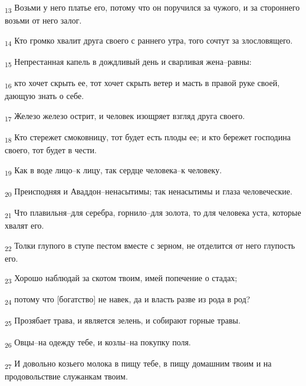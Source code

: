 \begin{tcolorbox}
\textsubscript{13} Возьми у него платье его, потому что он поручился за чужого, и за стороннего возьми от него залог.
\end{tcolorbox}
\begin{tcolorbox}
\textsubscript{14} Кто громко хвалит друга своего с раннего утра, того сочтут за злословящего.
\end{tcolorbox}
\begin{tcolorbox}
\textsubscript{15} Непрестанная капель в дождливый день и сварливая жена--равны:
\end{tcolorbox}
\begin{tcolorbox}
\textsubscript{16} кто хочет скрыть ее, тот хочет скрыть ветер и масть в правой руке своей, дающую знать о себе.
\end{tcolorbox}
\begin{tcolorbox}
\textsubscript{17} Железо железо острит, и человек изощряет взгляд друга своего.
\end{tcolorbox}
\begin{tcolorbox}
\textsubscript{18} Кто стережет смоковницу, тот будет есть плоды ее; и кто бережет господина своего, тот будет в чести.
\end{tcolorbox}
\begin{tcolorbox}
\textsubscript{19} Как в воде лицо--к лицу, так сердце человека--к человеку.
\end{tcolorbox}
\begin{tcolorbox}
\textsubscript{20} Преисподняя и Аваддон--ненасытимы; так ненасытимы и глаза человеческие.
\end{tcolorbox}
\begin{tcolorbox}
\textsubscript{21} Что плавильня--для серебра, горнило--для золота, то для человека уста, которые хвалят его.
\end{tcolorbox}
\begin{tcolorbox}
\textsubscript{22} Толки глупого в ступе пестом вместе с зерном, не отделится от него глупость его.
\end{tcolorbox}
\begin{tcolorbox}
\textsubscript{23} Хорошо наблюдай за скотом твоим, имей попечение о стадах;
\end{tcolorbox}
\begin{tcolorbox}
\textsubscript{24} потому что [богатство] не навек, да и власть разве из рода в род?
\end{tcolorbox}
\begin{tcolorbox}
\textsubscript{25} Прозябает трава, и является зелень, и собирают горные травы.
\end{tcolorbox}
\begin{tcolorbox}
\textsubscript{26} Овцы--на одежду тебе, и козлы--на покупку поля.
\end{tcolorbox}
\begin{tcolorbox}
\textsubscript{27} И довольно козьего молока в пищу тебе, в пищу домашним твоим и на продовольствие служанкам твоим.
\end{tcolorbox}

